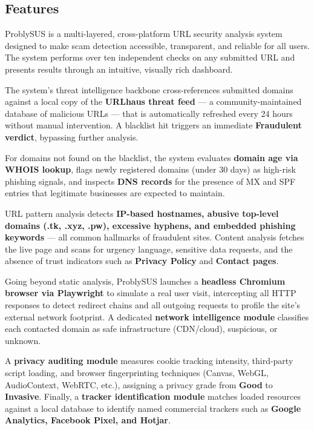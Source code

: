 \subsection{Features}

ProblySUS is a multi-layered, cross-platform URL security analysis system designed to make scam detection accessible, transparent, and reliable for all users. The system performs over ten independent checks on any submitted URL and presents results through an intuitive, visually rich dashboard.

The system's threat intelligence backbone cross-references submitted domains against a local copy of the \textbf{URLhaus threat feed} — a community-maintained database of malicious URLs — that is automatically refreshed every 24 hours without manual intervention. A blacklist hit triggers an immediate \textbf{Fraudulent verdict}, bypassing further analysis.

For domains not found on the blacklist, the system evaluates \textbf{domain age via WHOIS lookup}, flags newly registered domains (under 30 days) as high-risk phishing signals, and inspects \textbf{DNS records} for the presence of MX and SPF entries that legitimate businesses are expected to maintain.

URL pattern analysis detects \textbf{IP-based hostnames, abusive top-level domains (.tk, .xyz, .pw), excessive hyphens, and embedded phishing keywords} — all common hallmarks of fraudulent sites. Content analysis fetches the live page and scans for urgency language, sensitive data requests, and the absence of trust indicators such as \textbf{Privacy Policy} and \textbf{Contact pages}.

Going beyond static analysis, ProblySUS launches a \textbf{headless Chromium browser via Playwright} to simulate a real user visit, intercepting all HTTP responses to detect redirect chains and all outgoing requests to profile the site's external network footprint. A dedicated \textbf{network intelligence module} classifies each contacted domain as safe infrastructure (CDN/cloud), suspicious, or unknown.

A \textbf{privacy auditing module} measures cookie tracking intensity, third-party script loading, and browser fingerprinting techniques (Canvas, WebGL, AudioContext, WebRTC, etc.), assigning a privacy grade from \textbf{Good} to \textbf{Invasive}. Finally, a \textbf{tracker identification module} matches loaded resources against a local database to identify named commercial trackers such as \textbf{Google Analytics, Facebook Pixel, and Hotjar}.

